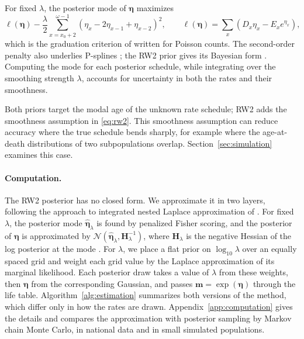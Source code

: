 \documentclass[12pt, letterpaper]{article}
\begin{document}
For fixed $\lambda$, the posterior mode of $\bm{\eta}$ maximizes
\begin{equation}
\ell(\bm{\eta}) - \frac{\lambda}{2} \sum_{x = x_0 + 2}^{\omega - 1} \left(\eta_x - 2\eta_{x-1} + \eta_{x-2}\right)^2,
\qquad
\ell(\bm{\eta}) = \sum_{x} \left( D_x \eta_x - E_x e^{\eta_x} \right),
\label{eq:penalized}
\end{equation}
which is the graduation criterion of \citet{whittaker1922new} written for Poisson counts. The second-order penalty also underlies P-splines \citep{eilers1996flexible, camarda2012mortalitysmooth}; the RW2 prior gives its Bayesian form \citep{lang2004bayesian, rue2005gaussian}. Computing the mode for each posterior schedule, while integrating over the smoothing strength $\lambda$, accounts for uncertainty in both the rates and their smoothness.

Both priors target the modal age of the unknown rate schedule; RW2 adds the smoothness assumption in \eqref{eq:rw2}. This smoothness assumption can reduce accuracy where the true schedule bends sharply, for example where the age-at-death distributions of two subpopulations overlap. Section~\ref{sec:simulation} examines this case.

\paragraph{Computation.} The RW2 posterior has no closed form. We approximate it in two layers, following the approach to integrated nested Laplace approximation of \citet{rue2009approximate}. For fixed $\lambda$, the posterior mode $\hat{\bm{\eta}}_\lambda$ is found by penalized Fisher scoring, and the posterior of $\bm{\eta}$ is approximated by $\mathcal{N}(\hat{\bm{\eta}}_\lambda, \bm{H}_\lambda^{-1})$, where $\bm{H}_\lambda$ is the negative Hessian of the log posterior at the mode \citep{tierney1986accurate}. For $\lambda$, we place a flat prior on $\log_{10} \lambda$ over an equally spaced grid and weight each grid value by the Laplace approximation of its marginal likelihood. Each posterior draw takes a value of $\lambda$ from these weights, then $\bm{\eta}$ from the corresponding Gaussian, and passes $\bm{m} = \exp(\bm{\eta})$ through the life table. Algorithm~\ref{alg:estimation} summarizes both versions of the method, which differ only in how the rates are drawn. Appendix~\ref{app:computation} gives the details and compares the approximation with posterior sampling by Markov chain Monte Carlo, in national data and in small simulated populations.
\end{document}
